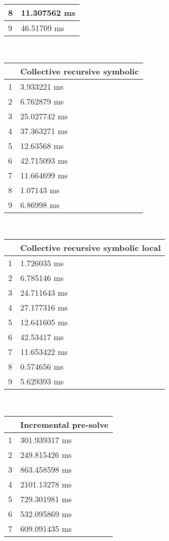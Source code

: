 \begin{multicols}{2}
\begin{tabular}{|l|l|}
		8 & 11.307562 ms \\ \hline
		9 & 46.51709 ms \\ \hline
	\end{tabular}\\
	\begin{tabular}{|l|l|}
		\hline
		& Collective recursive symbolic \\ \hline
		1 & 3.933221 ms \\ \hline
		2 & 6.762879 ms \\ \hline
		3 & 25.027742 ms \\ \hline
		4 & 37.363271 ms \\ \hline
		5 & 12.63568 ms \\ \hline
		6 & 42.715093 ms \\ \hline
		7 & 11.664699 ms \\ \hline
		8 & 1.07143 ms \\ \hline
		9 & 6.86998 ms \\ \hline
	\end{tabular}\\
	\begin{tabular}{|l|l|}
		\hline
		& Collective recursive symbolic local \\ \hline
		1 & 1.726035 ms \\ \hline
		2 & 6.785146 ms \\ \hline
		3 & 24.711643 ms \\ \hline
		4 & 27.177316 ms \\ \hline
		5 & 12.641605 ms \\ \hline
		6 & 42.53417 ms \\ \hline
		7 & 11.653422 ms \\ \hline
		8 & 0.574656 ms \\ \hline
		9 & 5.629393 ms \\ \hline
	\end{tabular}\\
	\begin{tabular}{|l|l|}
		\hline
		& Incremental pre-solve \\ \hline
		1 & 301.939317 ms \\ \hline
		2 & 249.815426 ms \\ \hline
		3 & 863.458598 ms \\ \hline
		4 & 2101.13278 ms \\ \hline
		5 & 729.301981 ms \\ \hline
		6 & 532.095869 ms \\ \hline
		7 & 609.091435 ms \\ \hline

\end{tabular}
\end{multicols}

